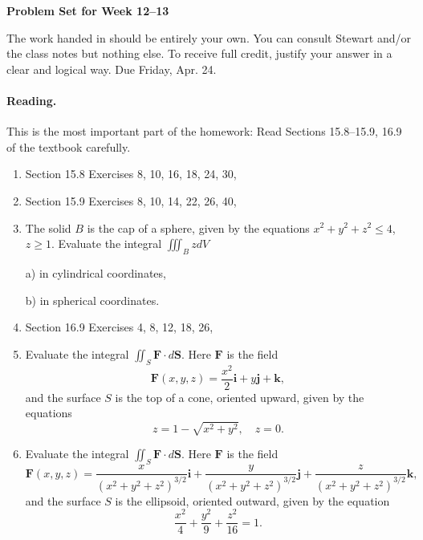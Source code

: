 \documentclass[11pt]{article}
\theoremstyle{plain}
\theoremstyle{definition}
\def\i{\mathbf i}
\def\j{\mathbf j}
\def\k{\mathbf k}
\def\F{\mathbf F}
\def\S{\mathbf S}
\begin{document}
\begin{center}
{\Large \bf Problem Set for Week 12--13}
\end{center}
The work handed in should be entirely your own. You can consult Stewart and/or the class notes but nothing else. To receive full credit, justify your answer in a clear and logical way. Due Friday, Apr. 24.

\paragraph{Reading.} This is the most important part of the homework: Read Sections 15.8--15.9, 16.9 of the textbook carefully.

\begin{enumerate}
\item Section 15.8 Exercises 8, 10, 16, 18, 24, 30,
\item Section 15.9 Exercises 8, 10, 14, 22, 26, 40,
\item The solid $B$ is the cap of a sphere, given by the equations
$x^2 + y^2 + z^2 \leq 4$, $z \geq 1$. Evaluate the integral $\iiint_BzdV$

a) in cylindrical coordinates,

b) in spherical coordinates.
\item Section 16.9 Exercises 4, 8, 12, 18, 26,
\item Evaluate the integral
$\iint_S
\F \cdot d\S$.
Here $\F$ is the field
\[
\F(x,y,z) =\frac{x^2}{2}\i + y \j + \k,
\]
and the surface $S$ is the top of a cone, oriented upward, given by the equations
\[
z = 1 -\sqrt{x^2 + y^2}, \quad z = 0.
\]
\item Evaluate the integral $\iint_S\F \cdot d\S$. Here $\F$ is the field
\[
\F(x,y,z) =\frac{x}{(x^2 + y^2 + z^2)^{3/2}}\i +
\frac{y}{(x^2 + y^2 + z^2)^{3/2}}\j+
\frac{z}{(x^2 + y^2 + z^2)^{3/2}}\k,
\]
and the surface $S$ is the ellipsoid, oriented outward, given by the equation
\[
\frac{x^2}{4}+\frac{y^2}{9}+\frac{z^2}{16} = 1.
\]
\end{enumerate}
\end{document}

